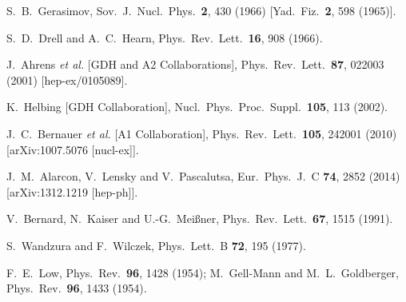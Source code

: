 \documentclass[prc,twocolumn,showpacs,preprintnumbers,amsmath,amssymb
,superscriptaddress,a4paper,nofootinbib
]{revtex4-1}
\begin{document}
\begin{thebibliography}{99}
  S.~B.~Gerasimov,
  Sov.\ J.\ Nucl.\ Phys.\  {\bf 2}, 430 (1966)
  [Yad.\ Fiz.\  {\bf 2}, 598 (1965)].
  
  S.~D.~Drell and A.~C.~Hearn,
  Phys.\ Rev.\ Lett.\  {\bf 16}, 908 (1966).
  
  J.~Ahrens {\it et al.}  [GDH and A2 Collaborations],
  Phys.\ Rev.\ Lett.\  {\bf 87}, 022003 (2001)
  [hep-ex/0105089].
  
  K.~Helbing [GDH Collaboration],
  Nucl.\ Phys.\ Proc.\ Suppl.\  {\bf 105}, 113 (2002).
  
  
  
  J.~C.~Bernauer {\it et al.}  [A1 Collaboration],
  Phys.\ Rev.\ Lett.\  {\bf 105}, 242001 (2010)
  [arXiv:1007.5076 [nucl-ex]].
  



  J.~M.~Alarcon, V.~Lensky and V.~Pascalutsa,
  Eur.\ Phys.\ J.\ C {\bf 74}, 2852 (2014)
  [arXiv:1312.1219 [hep-ph]].
  
  
  V.~Bernard, N.~Kaiser and U.-G.~Mei\ss ner,
  Phys.\ Rev.\ Lett.\  {\bf 67}, 1515 (1991).



  S.~Wandzura and F.~Wilczek,
  Phys.\ Lett.\ B {\bf 72}, 195 (1977).

F.~E.~Low,
  Phys.\ Rev.\  {\bf 96}, 1428 (1954); 
  M.~Gell-Mann and M.~L.~Goldberger,
  Phys.\ Rev.\  {\bf 96}, 1433 (1954).


\end{thebibliography}
\end{document}

